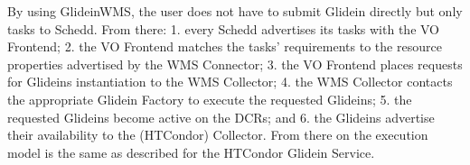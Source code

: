 By using GlideinWMS, the user does not have to submit Glidein directly but only tasks to Schedd. From there: 1. every Schedd advertises its tasks with the VO Frontend; 2. the VO Frontend matches the tasks’ requirements to the resource properties advertised by the WMS Connector; 3. the VO Frontend places requests for Glideins instantiation to the WMS Collector; 4. the WMS Collector contacts the appropriate Glidein Factory to execute the requested Glideins; 5. the requested Glideins become active on the DCRs; and 6. the Glideins advertise their availability to the (HTCondor) Collector. From there on the execution model is the same as described for the HTCondor Glidein Service.
\begin{comment}
The resources managed by a single Glidein (i.e., pilot) are limited to compute resources. Glideins may bind one or more cores, depending on the target DCRs. For example, heterogeneous HTCondor pools with resources for desktops, workstations, small campus clusters, and some larger clusters will run mostly single core Glideins. More specialized pools that hold, for example, only DCRs with HTC, Grid, or Cloud middleware may instantiate Glideins with a larger number of cores. Both HTCondor Glidein and GlideinWMS provide abstractions for file staging but pilots are not used to hold data or network resources.
The process of pilot deployment is the main difference between HTCondor Glidein and GlideinWMS. While the
HTCondor Glidein system requires users to submit the pilots to the DCRs, GlideinWMS automates and optimizes pilot provisioning. GlideinWMS attempts to maximize the throughput of task execution by continuously instantiating Glideins until the queues of the available Schedd are emptied. Once all the tasks have been executed, the remaining Glideins are terminated.
HTCondor Glidein and GlideWMS expose the interfaces of HTCondor to the application layer and no theoretical
limitations are posed on the type and complexity of the workloads that can be executed. For example, DAGMan
(Directed Acyclic Graph Manager) has been designed to execute workflows by submitting tasks to Schedd, and a tool is available to design applications based on the master-worker coordination pattern.


\end{comment}
